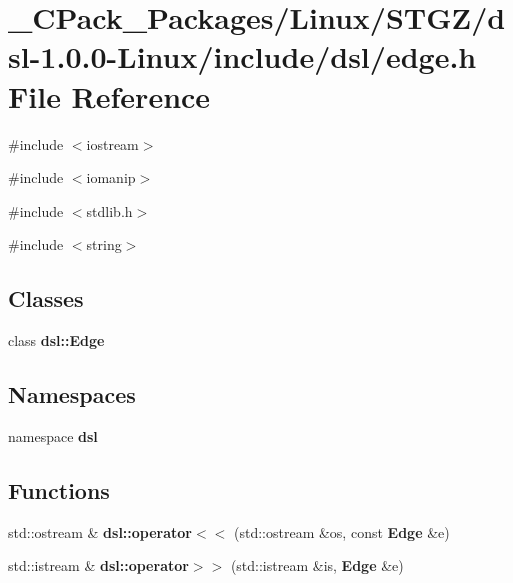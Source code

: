 \section{\_\-CPack\_\-Packages/Linux/STGZ/dsl-\/1.0.0-\/Linux/include/dsl/edge.h File Reference}
\label{__CPack__Packages_2Linux_2STGZ_2dsl-1_80_80-Linux_2include_2dsl_2edge_8h}
{\ttfamily \#include $<$iostream$>$}\par
{\ttfamily \#include $<$iomanip$>$}\par
{\ttfamily \#include $<$stdlib.h$>$}\par
{\ttfamily \#include $<$string$>$}\par
\subsection*{Classes}
\begin{DoxyCompactItemize}
\item 
class {\bf dsl::Edge}
\end{DoxyCompactItemize}
\subsection*{Namespaces}
\begin{DoxyCompactItemize}
\item 
namespace {\bf dsl}
\end{DoxyCompactItemize}
\subsection*{Functions}
\begin{DoxyCompactItemize}
\item 
std::ostream \& {\bf dsl::operator$<$$<$} (std::ostream \&os, const {\bf Edge} \&e)
\item 
std::istream \& {\bf dsl::operator$>$$>$} (std::istream \&is, {\bf Edge} \&e)
\end{DoxyCompactItemize}
